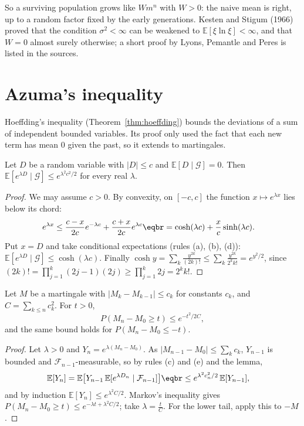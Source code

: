 \begin{remark}
So a surviving population grows like $Wm^n$ with $W>0$: the naive mean is right, up to a random factor fixed by the early
generations. Kesten and Stigum (1966) proved that the condition $\sigma^2<\infty$ can be weakened to $\mathbb E[\xi\ln\xi]<\infty$, and that $W=0$ almost surely
otherwise; a short proof by Lyons, Pemantle and Peres is listed in the sources.
\end{remark}

\section{Azuma's inequality}

Hoeffding's inequality (Theorem~\ref{thm:hoeffding}) bounds the deviations of a sum of independent bounded variables. Its proof only used the
fact that each new term has mean $0$ given the past, so it extends to martingales.

\begin{lemma}\label{lem:condhoeffding}
Let $D$ be a random variable with $|D|\le c$ and $\mathbb E[D\mid\mathcal G]=0$. Then $\mathbb E[e^{\lambda D}\mid\mathcal G]\le e^{\lambda^2c^2/2}$ for every real $\lambda$.
\end{lemma}
\begin{proof}
We may assume $c>0$. By convexity, on $[-c,c]$ the function $x\mapsto e^{\lambda x}$ lies below its chord:
\[
\begin{aligned}e^{\lambda x}&\le\frac{c-x}{2c}e^{-\lambda c}+\frac{c+x}{2c}e^{\lambda c}\eqbr=\cosh(\lambda c)+\frac xc\sinh(\lambda c).\end{aligned}
\]
Put $x=D$ and take conditional expectations (rules (a), (b), (d)): $\mathbb E[e^{\lambda D}\mid\mathcal G]\le\cosh(\lambda c)$. Finally $\cosh y=\sum_k\frac{y^{2k}}{(2k)!}\le\sum_k\frac{y^{2k}}{2^kk!}=e^{y^2/2}$,
since $(2k)!=\prod_{j=1}^k(2j-1)(2j)\ge\prod_{j=1}^k2j=2^kk!$.
\end{proof}

\begin{theorem}\label{thm:azuma}
Let $M$ be a martingale with $|M_k-M_{k-1}|\le c_k$ for constants $c_k$, and $C=\sum_{k\le n}c_k^2$. For $t>0$,
\[
P(M_n-M_0\ge t)\le e^{-t^2/2C},
\]
and the same bound holds for $P(M_n-M_0\le-t)$.
\end{theorem}
\begin{proof}
Let $\lambda>0$ and $Y_n=e^{\lambda(M_n-M_0)}$. As $|M_{n-1}-M_0|\le\sum_kc_k$, $Y_{n-1}$ is bounded and $\mathcal F_{n-1}$-measurable, so by rules (c) and (e) and the lemma,
\[
\begin{aligned}\mathbb E[Y_n]&=\mathbb E\bigl[Y_{n-1}\,\mathbb E[e^{\lambda D_n}\mid\mathcal F_{n-1}]\bigr]\eqbr\le e^{\lambda^2c_n^2/2}\,\mathbb E[Y_{n-1}],\end{aligned}
\]
and by induction $\mathbb E[Y_n]\le e^{\lambda^2C/2}$. Markov's inequality gives $P(M_n-M_0\ge t)\le e^{-\lambda t+\lambda^2C/2}$; take $\lambda=\frac tC$. For the lower tail, apply this to $-M$.
\end{proof}

